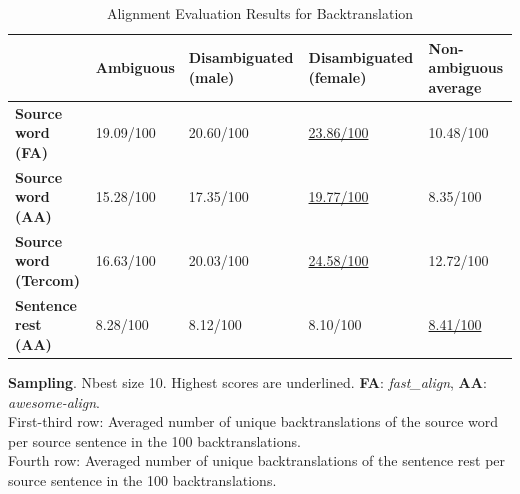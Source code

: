 \begin{table}[!htb]
    \ContinuedFloat 

    \begin{subtable}{\textwidth}
        \centering
        \begin{tabularx}{\linewidth}{|X|XXXX|}
            \hline
             & \textbf{Ambiguous} & \textbf{Disambiguated (male)} & \textbf{Disambiguated (female)} & \textbf{Non-ambiguous average} \\ \hline
             \textbf{Source word (FA)} & 19.09/100 & 20.60/100 & \underline{23.86/100} & 10.48/100 \\ 
             \textbf{Source word (AA)} & 15.28/100 & 17.35/100 & \underline{19.77/100} & 8.35/100 \\ 
             \textbf{Source word (Tercom)} & 16.63/100 & 20.03/100 & \underline{24.58/100} & 12.72/100 \\ \hline
             \textbf{Sentence rest (AA)} & 8.28/100 & 8.12/100 & 8.10/100 & \underline{8.41/100} \\ \hline
        \end{tabularx}
        \caption{\textbf{Sampling}. Nbest size 10. Highest scores are underlined. \textbf{FA}: \textit{fast\_align}, \textbf{AA}: \textit{awesome-align}. \\ First-third row: Averaged number of unique backtranslations of the source word per source sentence in the 100 backtranslations. \\ Fourth row: Averaged number of unique backtranslations of the sentence rest per source sentence in the 100 backtranslations.}
        \label{tab:alignment_backtranslation_sampling}
    \end{subtable}

    \caption{Alignment Evaluation Results for Backtranslation}
    \label{tab:alignment_backtranslation}
\end{table}



